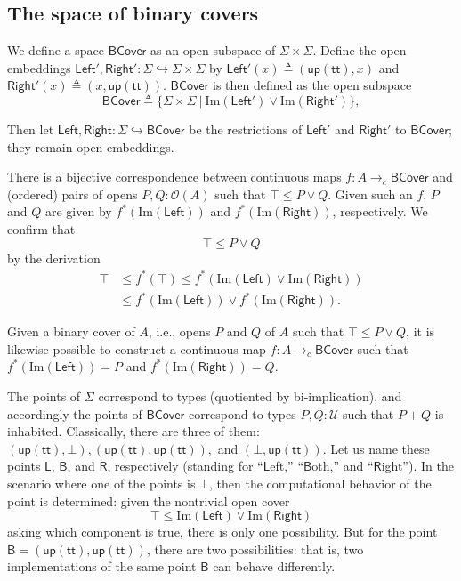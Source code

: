 \documentclass[conference]{IEEEtran}
\newcommand{\hookto}{\hookrightarrow}
\newcommand{\cto}{\to_c}
\newcommand{\Type}{\mathcal{U}}
\newcommand{\suchthat}{\ |\ }
\newcommand{\Open}[1]{\mathcal{O}({#1})}
\newcommand{\Img}[1]{\text{Im}\left({#1}\right)}
\newcommand{\strue}{\mathsf{up}(\mathsf{tt})}
\newcommand{\sfalse}{\bot}
\newcommand{\BCover}{\mathsf{BCover}}
\newcommand{\iimg}[1]{#1^*}
\begin{document}
\subsection{The space of binary covers}

We define a space $\BCover$ as an open subspace of $\Sigma \times \Sigma$. Define the open embeddings $\mathsf{Left}', \mathsf{Right}' : \Sigma \hookto \Sigma \times \Sigma$ by 
$\mathsf{Left}'(x) \triangleq (\strue, x)$ and
$\mathsf{Right}'(x) \triangleq (x, \strue)$.
$\BCover$ is then defined as the open subspace
\[
\BCover \triangleq \{ \Sigma \times \Sigma \suchthat \Img{\mathsf{Left}'} \vee \Img{\mathsf{Right}'} \},
\]

Then let $\mathsf{Left}, \mathsf{Right} : \Sigma \hookto \BCover$ be the restrictions of $\mathsf{Left}'$ and $\mathsf{Right}'$ to $\BCover$; they remain open embeddings.

There is a bijective correspondence between continuous maps $f : A \cto \BCover$ and (ordered) pairs of opens $P, Q : \Open{A}$ such that $\top \le P \vee Q$. Given such an $f$, $P$ and $Q$ are given by $\iimg{f}(\Img{\mathsf{Left}})$ and $\iimg{f}(\Img{\mathsf{Right}})$, respectively. We confirm that
\[
\top \le P \vee Q
\]
by the derivation
\begin{align*}
\top &\le \iimg{f}(\top) 
  \le \iimg{f}(\Img{\mathsf{Left}} \vee \Img{\mathsf{Right}})
 \\ &\le \iimg{f}(\Img{\mathsf{Left}}) \vee \iimg{f}(\Img{\mathsf{Right}}).
\end{align*}

Given a binary cover of $A$, i.e., opens $P$ and $Q$ of $A$ such that $\top \le P \vee Q$, it is likewise possible to construct a continuous map $f: A \cto \BCover$ such that $\iimg{f}(\Img{\mathsf{Left}}) = P$ and $\iimg{f}(\Img{\mathsf{Right}}) = Q$.

The points of $\Sigma$ correspond to types (quotiented by bi-implication), and accordingly the points of $\BCover$ correspond to types $P, Q : \Type$ such that $P + Q$ is inhabited. Classically, there are three of them: $(\strue, \sfalse), (\strue, \strue),$ and $(\sfalse, \strue)$. Let us name these points $\mathsf{L}$, $\mathsf{B}$, and $\mathsf{R}$, respectively (standing for ``$\mathsf{L}$eft,'' ``$\mathsf{B}$oth,'' and ``$\mathsf{R}$ight''). In the scenario where one of the points is $\sfalse$, then the computational behavior of the point is determined: given the nontrivial open cover 
\[
\top \le \Img{\mathsf{Left}} \vee \Img{\mathsf{Right}}
\]
asking which component is true, there is only one possibility. But for the point $\mathsf{B} = (\strue, \strue)$, there are two possibilities: that is, two implementations of the same point $\mathsf{B}$ can behave differently.
\end{document}
